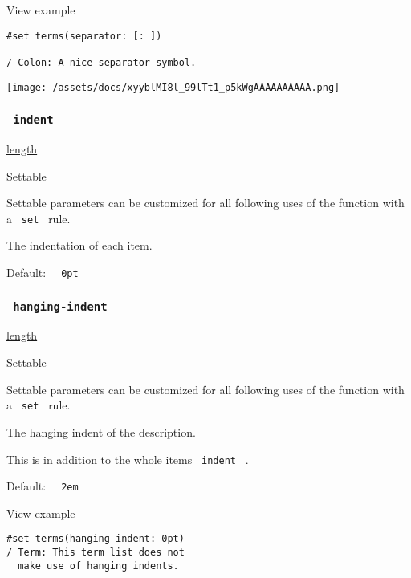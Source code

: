 
View example

\begin{verbatim}
#set terms(separator: [: ])

/ Colon: A nice separator symbol.
\end{verbatim}

\texttt{[image: /assets/docs/xyyblMI8l\_99lTt1\_p5kWgAAAAAAAAAA.png]}

\subsubsection{\texorpdfstring{\texttt{\ indent\ }}{ indent }}\label{parameters-indent}

\href{/docs/reference/layout/length/}{length}

{{ Settable }}

\label{parameters-indent-settable-tooltip}
Settable parameters can be customized for all following uses of the
function with a \texttt{\ set\ } rule.

The indentation of each item.

Default: \texttt{\ }{\texttt{\ 0pt\ }}\texttt{\ }

\subsubsection{\texorpdfstring{\texttt{\ hanging-indent\ }}{ hanging-indent }}\label{parameters-hanging-indent}

\href{/docs/reference/layout/length/}{length}

{{ Settable }}

\label{parameters-hanging-indent-settable-tooltip}
Settable parameters can be customized for all following uses of the
function with a \texttt{\ set\ } rule.

The hanging indent of the description.

This is in addition to the whole item\textquotesingle s
\texttt{\ indent\ } .

Default: \texttt{\ }{\texttt{\ 2em\ }}\texttt{\ }


View example

\begin{verbatim}
#set terms(hanging-indent: 0pt)
/ Term: This term list does not
  make use of hanging indents.
\end{verbatim}

